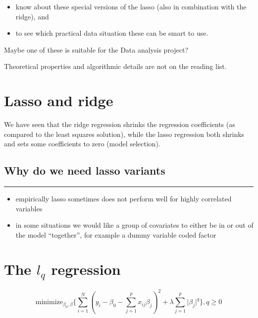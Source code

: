 \documentclass[
  letterpaper,
  DIV=11,
  numbers=noendperiod]{scrartcl}
\providecommand{\tightlist}{%
  \setlength{\itemsep}{0pt}\setlength{\parskip}{0pt}}\usepackage{longtable,booktabs,array}
\begin{document}
\begin{itemize}
\tightlist
\item
  know about these special versions of the lasso (also in combination
  with the ridge), and
\item
  to see which practical data situation these can be smart to use.
\end{itemize}

Maybe one of these is suitable for the Data analysis project?

Theoretical properties and algorithmic details are not on the reading
list.

\hypertarget{lasso-and-ridge}{%
\section{Lasso and ridge}\label{lasso-and-ridge}}

We have seen that the ridge regression shrinks the regression
coefficients (as compared to the least squares solution), while the
lasso regression both shrinks and sets some coefficients to zero (model
selection).

\hypertarget{why-do-we-need-lasso-variants}{%
\subsection{Why do we need lasso
variants}\label{why-do-we-need-lasso-variants}}

\begin{center}\rule{0.5\linewidth}{0.5pt}\end{center}

\begin{itemize}
\tightlist
\item
  empirically lasso sometimes does not perform well for highly
  correlated variables
\item
  in some situations we would like a group of covariates to either be in
  or out of the model ``together'', for example a dummy variable coded
  factor
\end{itemize}

\hypertarget{the-l_q-regression}{%
\section{\texorpdfstring{The \(l_q\)
regression}{The l\_q regression}}\label{the-l_q-regression}}

\[ \text{minimize}_{\beta_0,\beta} \{ \sum_{i=1}^N (y_i-\beta_0-\sum_{j=1}^p x_{ij}\beta_j )^2 + \lambda \sum_{j=1}^p \lvert \beta_j\rvert^q \}, q\ge 0\]
\end{document}
